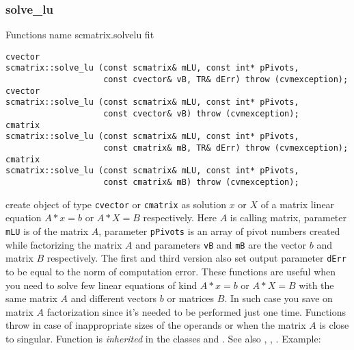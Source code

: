 \subsubsection{solve\_lu}
Functions%
\pdfdest name {scmatrix.solvelu} fit
\begin{verbatim}
cvector
scmatrix::solve_lu (const scmatrix& mLU, const int* pPivots,
                    const cvector& vB, TR& dErr) throw (cvmexception);
cvector
scmatrix::solve_lu (const scmatrix& mLU, const int* pPivots,
                    const cvector& vB) throw (cvmexception);
cmatrix
scmatrix::solve_lu (const scmatrix& mLU, const int* pPivots,
                    const cmatrix& mB, TR& dErr) throw (cvmexception);
cmatrix
scmatrix::solve_lu (const scmatrix& mLU, const int* pPivots,
                    const cmatrix& mB) throw (cvmexception);
\end{verbatim}
create  object of type \verb"cvector" or \verb"cmatrix" as
 solution $x$ or $X$ of a matrix linear equation
$A*x=b$ or $A*X=B$ respectively. Here $A$ is  calling
matrix, 
parameter \verb"mLU" is 
of the matrix $A$, parameter \verb"pPivots" is an array of pivot numbers
created while factorizing the matrix $A$
and parameters \verb"vB" and \verb"mB" are the vector $b$ and
matrix $B$ respectively.
The first and third version also set output parameter \verb"dErr" to be equal
to the norm of computation error.
These functions are useful when you need to solve few linear equations
of kind $A*x=b$ or $A*X=B$ with the same matrix $A$ and different vectors $b$ 
or matrices $B$.
In such case you save on matrix $A$ factorization since it's needed to be
performed just one time.
Functions throw 
in case of inappropriate sizes
of the operands or when the matrix $A$ is close to singular.
Function is \emph{inherited} in the classes
and .
See also
,
,
.
Example:
